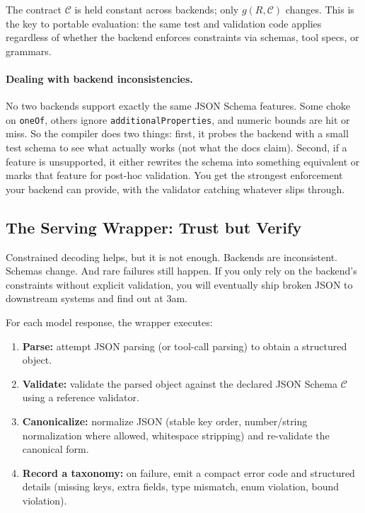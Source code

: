 \documentclass[11pt]{article}
\begin{document}
The contract $\mathcal{C}$ is held constant across backends; only $g(R,\mathcal{C})$ changes.
This is the key to portable evaluation: the same test and validation code applies regardless of whether the backend enforces constraints via schemas, tool specs, or grammars.

\paragraph{Dealing with backend inconsistencies.}
No two backends support exactly the same JSON Schema features.
Some choke on \texttt{oneOf}, others ignore \texttt{additionalProperties}, and numeric bounds are hit or miss.
So the compiler does two things: first, it probes the backend with a small test schema to see what actually works (not what the docs claim).
Second, if a feature is unsupported, it either rewrites the schema into something equivalent or marks that feature for post-hoc validation.
You get the strongest enforcement your backend can provide, with the validator catching whatever slips through.

\subsection{The Serving Wrapper: Trust but Verify}

Constrained decoding helps, but it is not enough.
Backends are inconsistent.
Schemas change.
And rare failures still happen.
If you only rely on the backend's constraints without explicit validation, you will eventually ship broken JSON to downstream systems and find out at 3am.

For each model response, the wrapper executes:

\begin{enumerate}[leftmargin=12pt]
    \item \textbf{Parse:} attempt JSON parsing (or tool-call parsing) to obtain a structured object.
    \item \textbf{Validate:} validate the parsed object against the declared JSON Schema $\mathcal{C}$ using a reference validator.
    \item \textbf{Canonicalize:} normalize JSON (stable key order, number/string normalization where allowed, whitespace stripping) and re-validate the canonical form.
    \item \textbf{Record a taxonomy:} on failure, emit a compact error code and structured details (missing keys, extra fields, type mismatch, enum violation, bound violation).
\end{enumerate}
\end{document}

